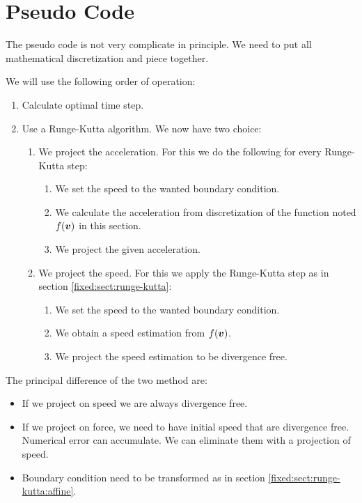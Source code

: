 \section{Pseudo Code}

The pseudo code is not very complicate in principle.
We need to put all mathematical discretization and piece together.

We will use the following order of operation:
\begin{enumerate}
\item Calculate optimal time step.
 \item Use a Runge-Kutta algorithm. We now have two choice:
 \begin{enumerate}
  \item We project the acceleration.
	For this we do the following for every Runge-Kutta step:
	\begin{enumerate}
	\item We set the speed to the wanted boundary condition.
	 \item We calculate the acceleration from discretization of the function noted $f({\boldsymbol {v}})$ in this section.
	 \item We project the given acceleration.
	\end{enumerate}
 \item We project the speed.
 For this we apply the Runge-Kutta step as in section \ref{fixed:sect:runge-kutta}:
	\begin{enumerate}
	\item We set the speed to the wanted boundary condition.
	\item We obtain a speed estimation from $f({\boldsymbol {v}})$.
	\item We project the speed estimation to be divergence free.
	\end{enumerate}
 \end{enumerate}

\end{enumerate}

The principal difference of the two method are:
\begin{itemize}
 \item If we project on speed we are always divergence free.
 \item If we project on force, we need to have initial speed that are divergence free. Numerical error can accumulate.
 We can eliminate them with a projection of speed.
 \item Boundary condition need to be transformed as in section \ref{fixed:sect:runge-kutta:affine}.
\end{itemize}

